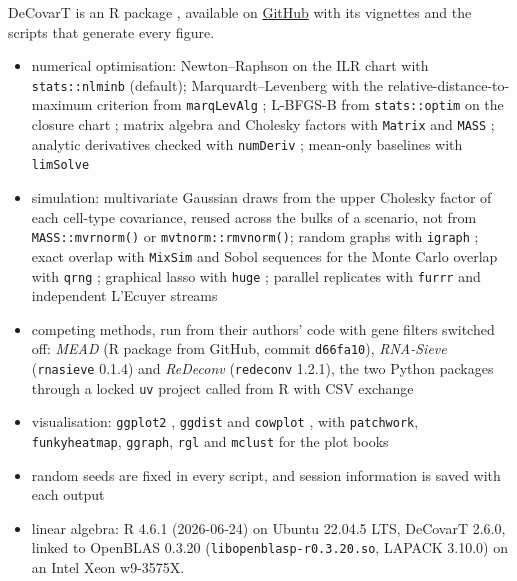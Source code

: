 \documentclass[pdflatex, sn-nature]{sn-jnl}
\theoremstyle{thmstyleone}%
\theoremstyle{thmstyletwo}%
\theoremstyle{thmstylethree}%
\begin{document}
DeCovarT is an R package \cite{R-base}, available on
\href{https://github.com/bastienchassagnol/DeCovarT}{GitHub} with its vignettes and the scripts
that generate every figure.
\begin{itemize}
  \item numerical optimisation: Newton--Raphson on the ILR chart with \texttt{stats::nlminb} (default);
        Marquardt--Levenberg with the relative-distance-to-maximum criterion from \texttt{marqLevAlg}
        \cite{R-marqLevAlg,philippsRobustEfficientOptimization2021}; L-BFGS-B from
        \texttt{stats::optim} on the closure chart \cite{byrdLimitedMemoryAlgorithm1995}; matrix algebra and Cholesky factors with
        \texttt{Matrix} and \texttt{MASS} \cite{R-Matrix,R-MASS}; analytic derivatives checked with
        \texttt{numDeriv} \cite{R-numDeriv}; mean-only baselines with \texttt{limSolve}
        \cite{R-limSolve}
  \item simulation: multivariate Gaussian draws from the upper Cholesky factor of each
        cell-type covariance, reused across the bulks of a scenario, not from
        \texttt{MASS::mvrnorm()} or \texttt{mvtnorm::rmvnorm()}; random graphs with
        \texttt{igraph} \cite{R-igraph}; exact overlap with \texttt{MixSim} \cite{R-MixSim} and Sobol sequences
        for the Monte Carlo overlap with \texttt{qrng} \cite{R-qrng}; graphical lasso with \texttt{huge}
        \cite{R-huge}; parallel replicates with \texttt{furrr} and independent L'Ecuyer streams
        \cite{R-furrr}
  \item competing methods, run from their authors' code with gene filters switched off: \emph{MEAD} (R package from
        GitHub, commit \texttt{d66fa10}), \emph{RNA-Sieve} (\texttt{rnasieve} 0.1.4) and \emph{ReDeconv}
        (\texttt{redeconv} 1.2.1), the two Python packages through a locked \texttt{uv} project called from R with
        CSV exchange
  \item visualisation: \texttt{ggplot2} \cite{R-ggplot2}, \texttt{ggdist} \cite{R-ggdist} and \texttt{cowplot}
        \cite{R-cowplot}, with \texttt{patchwork}, \texttt{funkyheatmap}, \texttt{ggraph}, \texttt{rgl} and
        \texttt{mclust} \cite{R-mclust} for the plot books
  \item random seeds are fixed in every script, and session information is saved with each output
  \item linear algebra: R 4.6.1 (2026-06-24) on Ubuntu 22.04.5 LTS, DeCovarT 2.6.0, linked to
        OpenBLAS 0.3.20 (\texttt{libopenblasp-r0.3.20.so}, LAPACK 3.10.0) on an Intel Xeon w9-3575X.

\end{itemize}
\end{document}
